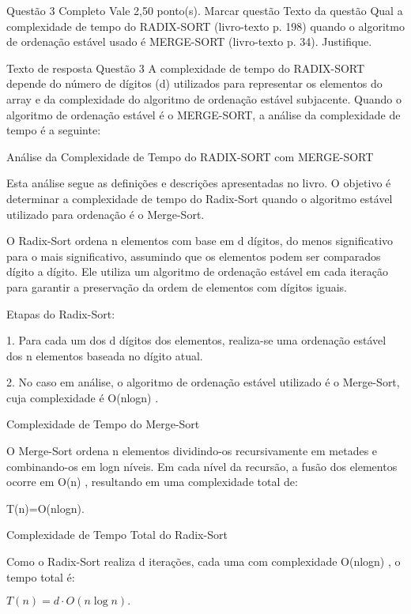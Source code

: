 Questão 3
Completo
Vale 2,50 ponto(s).
Marcar questão
Texto da questão
Qual a complexidade de tempo do RADIX-SORT (livro-texto p. 198) quando o algoritmo de ordenação estável usado é MERGE-SORT (livro-texto p. 34). Justifique.

Texto de resposta Questão 3
A complexidade de tempo do RADIX-SORT depende do número de dígitos (d)
 utilizados para representar os elementos do array e da complexidade do algoritmo de ordenação estável subjacente. Quando o algoritmo de ordenação estável é o MERGE-SORT, a análise da complexidade de tempo é a seguinte:



Análise da Complexidade de Tempo do RADIX-SORT com MERGE-SORT

Esta análise segue as definições e descrições apresentadas no livro. O objetivo é determinar a complexidade de tempo do Radix-Sort quando o algoritmo estável utilizado para ordenação é o Merge-Sort.



O Radix-Sort ordena n
 elementos com base em d
 dígitos, do menos significativo para o mais significativo, assumindo que os elementos podem ser comparados dígito a dígito. Ele utiliza um algoritmo de ordenação estável em cada iteração para garantir a preservação da ordem de elementos com dígitos iguais.



Etapas do Radix-Sort:

1. Para cada um dos d
 dígitos dos elementos, realiza-se uma ordenação estável dos n
 elementos baseada no dígito atual.

2. No caso em análise, o algoritmo de ordenação estável utilizado é o Merge-Sort, cuja complexidade é O(nlogn)
.



Complexidade de Tempo do Merge-Sort

O Merge-Sort ordena n
 elementos dividindo-os recursivamente em metades e combinando-os em logn
 níveis. Em cada nível da recursão, a fusão dos elementos ocorre em O(n)
, resultando em uma complexidade total de:

T(n)=O(nlogn).



Complexidade de Tempo Total do Radix-Sort

Como o Radix-Sort realiza d
 iterações, cada uma com complexidade O(nlogn)
, o tempo total é:

\( T(n) = d \cdot O(n \log n). \)



